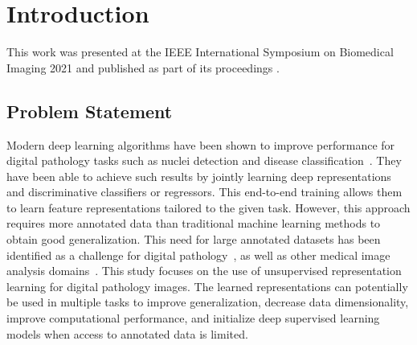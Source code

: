 \section{Introduction}
This work was presented at the IEEE International Symposium on Biomedical Imaging 2021 and published as part of its proceedings \citep{carse2021unsupervised}.

\subsection{Problem Statement}
Modern deep learning algorithms have been shown to improve performance for digital pathology tasks such as nuclei detection and disease classification~\cite{litjens2017survey}. They have been able to achieve such results by jointly learning deep representations and discriminative classifiers or regressors. This end-to-end training allows them to learn feature representations tailored to the given task. However, this approach requires more annotated data than traditional machine learning methods to obtain good generalization. This need for large annotated datasets has been identified as a challenge for digital pathology~\cite{madabhushi2016image}, as well as other medical image analysis domains~\cite{litjens2017survey}. This study focuses on the use of unsupervised representation learning for digital pathology images. The learned representations can potentially be used in multiple tasks to improve generalization, decrease data dimensionality, improve computational performance, and initialize deep supervised learning models when access to annotated data is limited. 

